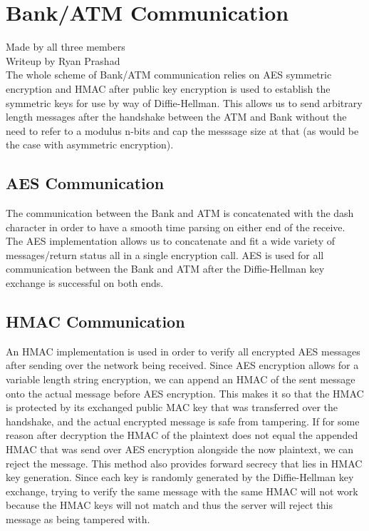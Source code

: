 \section{Bank/ATM Communication}\label{sec:batmcoms}
Made by all three members\\
Writeup by Ryan Prashad\\

	\medskip
	The whole scheme of Bank/ATM communication relies on AES symmetric encryption and HMAC after public key encryption is used to  establish the symmetric keys for use by way of Diffie-Hellman. This allows us to send arbitrary length messages after the handshake between the ATM and Bank without the need to refer to a modulus n-bits and cap the messsage size at that (as would be the case with asymmetric encryption).
	
	\subsection{AES Communication}\label{sec:aescoms}
		The communication between the Bank and ATM is concatenated with the dash character in order to have a smooth time parsing on either end of the receive. The AES implementation allows us to concatenate and fit a wide variety of messages/return status all in a single encryption call. AES is used for all communication between the Bank and ATM after the Diffie-Hellman key exchange is successful on both ends.
	
	\subsection{HMAC Communication}\label{sec:hmaccoms}
		An HMAC implementation is used in order to verify all encrypted AES messages after sending over the network being received. Since AES encryption allows for a variable length string encryption, we can append an HMAC of the sent message onto the actual message before AES encryption. This makes it so that the HMAC is protected by its exchanged public MAC key that was transferred over the handshake, and the actual encrypted message is safe from tampering. If for some reason after decryption the HMAC of the plaintext does not equal the appended HMAC that was send over AES encryption alongside the now plaintext, we can reject the message. This method also provides forward secrecy that lies in HMAC key generation. Since each key is randomly generated by the Diffie-Hellman key exchange, trying to verify the same message with the same HMAC will not work because the HMAC keys will not match and thus the server will reject this message as being tampered with.
